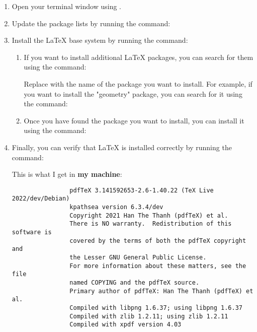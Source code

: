\documentclass[12pt]{article}
\begin{document}
	\begin{enumerate}
		\item Open your terminal window using .
		\item Update the package lists by running the command:
		
		
		\item Install the LaTeX base system by running the command:
		
		
		\begin{enumerate}
			\item If you want to install additional LaTeX packages, you can search for them using the command:
			
			
			Replace with the name of the package you want to install. For example, if you want to install the "geometry" package, you can search for it using the command:
			
			
			\item Once you have found the package you want to install, you can install it using the command:
			
		\end{enumerate}
	    
	    \item Finally, you can verify that LaTeX is installed correctly by running the command:
	    
	    
	    This is what I get in \textbf{my machine}:
	    
	    \begin{mdframed}[style=myboxstyleTerminal1]
	    	\begin{verbatim}
	    		pdfTeX 3.141592653-2.6-1.40.22 (TeX Live 2022/dev/Debian)
	    		kpathsea version 6.3.4/dev
	    		Copyright 2021 Han The Thanh (pdfTeX) et al.
	    		There is NO warranty.  Redistribution of this software is
	    		covered by the terms of both the pdfTeX copyright and
	    		the Lesser GNU General Public License.
	    		For more information about these matters, see the file
	    		named COPYING and the pdfTeX source.
	    		Primary author of pdfTeX: Han The Thanh (pdfTeX) et al.
	    		Compiled with libpng 1.6.37; using libpng 1.6.37
	    		Compiled with zlib 1.2.11; using zlib 1.2.11
	    		Compiled with xpdf version 4.03
	    	\end{verbatim}
	    \end{mdframed} 
	\end{enumerate}
	
\end{document}
